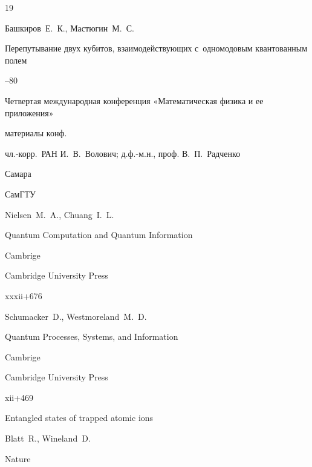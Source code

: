 \begin{thebibliography}{19}




\by  Башкиров~Е.~К., Мастюгин~М.~С.

\paper Перепутывание двух кубитов, взаимодействующих с~одномодовым квантованным полем 

--80

\inbook Четвертая международная конференция «Математическая физика и ее приложения»

\bookinfo материалы конф. 

\eds чл.-корр.~РАН И.~В.~Волович; д.ф.-м.н., проф. В.~П.~Радченко

\publaddr Самара

\publ СамГТУ







\by Nielsen~M.~A., Chuang~I.~L.

\book Quantum Computation and Quantum Information

\publaddr Cambrige

\publ Cambridge University Press



\totalpages xxxii+676




\by Schumacker~D.,  Westmoreland~M.~D.

\book Quantum Processes, Systems, and Information

\publaddr Cambrige

\publ Cambridge University Press


\totalpages xii+469











\paper Entangled states of trapped atomic ions

\by  Blatt~R.,  Wineland~D.

\jour Nature


\end{thebibliography}

